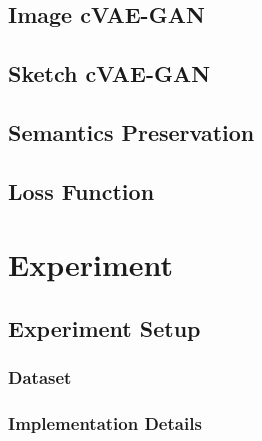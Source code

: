 \documentclass[10pt,twocolumn,letterpaper]{article}
\begin{document}
\subsection{Image cVAE-GAN} \label{3.3}


\subsection{Sketch cVAE-GAN} \label{3.4}

\subsection{Semantics Preservation} \label{3.5}

\subsection{Loss Function} \label{3.6}




\section{Experiment}

\subsection{Experiment Setup}

\subsubsection{Dataset}

\subsubsection{Implementation Details}
\end{document}
